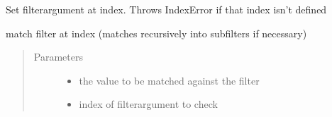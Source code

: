 \documentclass[a4paper,10pt,english]{sphinxmanual}
\begin{document}
\begin{fulllineitems}
\begin{fulllineitems}
\end{fulllineitems}


\begin{fulllineitems}
\label{\detokenize{fagus.filters:fagus.filters.KFil.__setitem__}}
\pysigstartsignatures
{}
\pysigstopsignatures
\sphinxAtStartPar
Set filter\sphinxhyphen{}argument at index. Throws IndexError if that index isn’t defined

\end{fulllineitems}


\begin{fulllineitems}
\label{\detokenize{fagus.filters:fagus.filters.KFil.match}}
\pysigstartsignatures
{}
\pysigstopsignatures
\sphinxAtStartPar
match filter at index (matches recursively into subfilters if necessary)
\begin{quote}\begin{description}
\item[{Parameters}] \leavevmode\begin{itemize}
\item {}
\sphinxAtStartPar
{} \textendash{} the value to be matched against the filter

\item {}
\sphinxAtStartPar
{} \textendash{} index of filter\sphinxhyphen{}argument to check


\end{itemize}
\end{description}
\end{quote}
\end{fulllineitems}
\end{fulllineitems}
\end{document}
